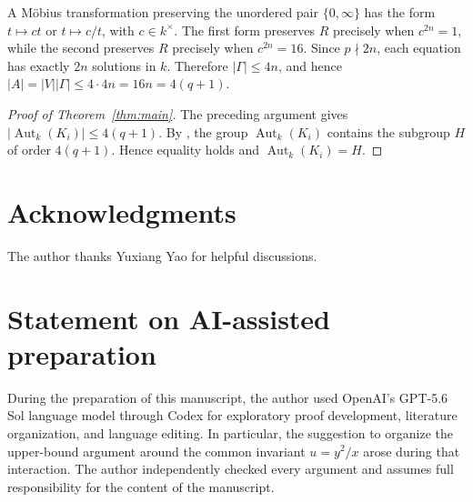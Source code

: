 \documentclass[11pt,reqno]{amsart}
\theoremstyle{remark}
\newcommand{\Aut}{\operatorname{Aut}}
\begin{document}
A M\"{o}bius transformation preserving the unordered pair $\{0,\infty\}$ has the form $t\mapsto ct$ or $t\mapsto c/t$, with $c\in k^\times$. The first form preserves $R$ precisely when $c^{2n}=1$, while the second preserves $R$ precisely when $c^{2n}=16$. Since $p\nmid2n$, each equation has exactly $2n$ solutions in $k$. Therefore $|\Gamma|\leq4n$, and hence $|A|=|V||\Gamma|\leq4\cdot4n=16n=4(q+1)$.

\begin{proof}[Proof of Theorem~\ref{thm:main}]
The preceding argument gives $|\Aut_k(K_i)|\leq4(q+1)$. By \cite[Theorem~4.6]{BeelenMontanucciNiemannQuoos}, the group $\Aut_k(K_i)$ contains the subgroup $H$ of order $4(q+1)$. Hence equality holds and $\Aut_k(K_i)=H$.
\end{proof}

\enlargethispage{3\baselineskip}
\section*{Acknowledgments}
The author thanks Yuxiang Yao for helpful discussions.

\section*{Statement on AI-assisted preparation}
During the preparation of this manuscript, the author used OpenAI's GPT-5.6 Sol
language model through Codex for exploratory proof development, literature
organization, and language editing. In particular, the suggestion to organize
the upper-bound argument around the common invariant $u=y^2/x$ arose during
that interaction. The author independently checked every argument 
and assumes full responsibility for the content of the manuscript.

\printbibliography[title={References}]
\end{document}
